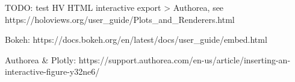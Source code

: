 TODO: test HV HTML interactive export > Authorea, see https://holoviews.org/user_guide/Plots_and_Renderers.html

Bokeh: https://docs.bokeh.org/en/latest/docs/user_guide/embed.html

Authorea & Plotly: https://support.authorea.com/en-us/article/inserting-an-interactive-figure-y32ne6/
